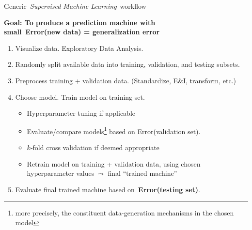 
\renewcommand*{\thefootnote}{\fnsymbol{footnote}}
\setcounter{footnote}{1}


\begin{frame}{\large Generic \,\textit{\Large Supervised Machine Learning}\, workflow}

\small

\begin{center}
\vskip -0.2cm
\textbf{\normalsize Goal: To produce a prediction machine with\\small \,{\color{blue}Error(new data) = generalization error}}
\end{center}

\vskip -0.2cm
\begin{enumerate}
\item
	Visualize data. Exploratory Data Analysis.

\vskip -0.25cm
\item
	Randomly split available data into {\color{red}training}, {\color{red}validation}, and
	{\color{red}testing} subsets.

\vskip -0.25cm
\item
	Preprocess training + validation data. {\scriptsize(Standardize, E\&I, transform, etc.)}

\vskip -0.25cm
\item
	Choose model. Train model on training set.
	\begin{itemize}
	\item
		\vskip -0.1cm
		{\footnotesize{\color{red}Hyperparameter tuning} if applicable}
	\item
		{\footnotesize Evaluate/compare models\!\!\footnote{\tiny\color{gray}\!\!more precisely,
		the constituent data-generation mechanisms in the chosen model}
		based on Error(validation set).}
	\item
		{\footnotesize{\color{red}$k$-fold cross validation} if deemed appropriate}
	\item
		{\footnotesize Retrain model on training + validation data,
		using chosen hyperparameter values \;$\leadsto$\; final ``trained machine''}
	\end{itemize}

\vskip -0.25cm
\item
	Evaluate final trained machine based on \,\textbf{\color{blue}Error(testing set)}.
\end{enumerate}

\end{frame}
\normalsize

